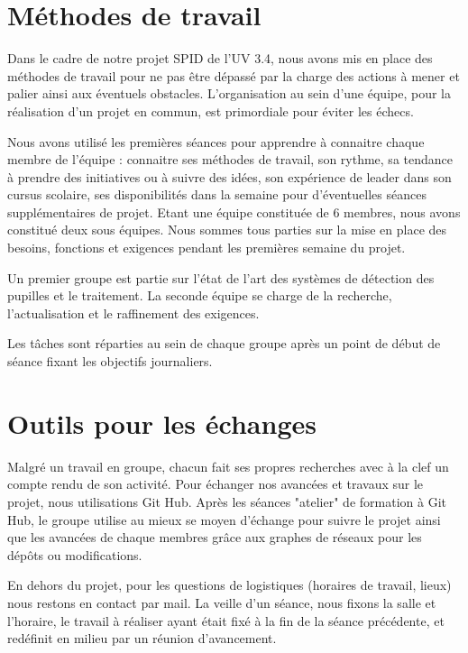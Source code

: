 
\chapter{Méthodes de travail}

Dans le cadre de notre projet SPID de l’UV 3.4, nous avons mis en place des méthodes de travail pour ne pas être dépassé par la charge des actions à mener et palier ainsi aux éventuels obstacles.  
L’organisation au sein d’une équipe, pour la réalisation d’un projet en commun, est primordiale pour éviter les échecs.

Nous avons utilisé les premières séances pour apprendre à connaitre chaque membre de l’équipe : connaitre ses méthodes de travail, son rythme, sa tendance à prendre des initiatives ou à suivre des idées, son expérience de leader dans son cursus scolaire, ses disponibilités dans la semaine pour d’éventuelles séances supplémentaires de projet. 
Etant une équipe constituée de 6 membres, nous avons constitué deux sous équipes. Nous sommes tous parties sur la mise en place des besoins, fonctions et exigences pendant les premières semaine du projet. 

Un premier groupe est partie sur l'état de l'art des systèmes de détection des pupilles et le traitement. La seconde équipe se charge de la recherche, l'actualisation et le raffinement  des exigences. 

Les tâches sont réparties au sein de chaque groupe après un point de début de séance fixant les objectifs journaliers. 

\chapter{Outils pour les échanges}

Malgré un travail en groupe, chacun fait ses propres recherches avec à la clef un compte rendu de son activité. Pour échanger nos avancées et travaux sur le projet, nous utilisations Git Hub. Après les séances "atelier" de formation à Git Hub, le groupe utilise au mieux se moyen d'échange pour suivre le projet ainsi que les avancées de chaque membres grâce aux graphes de réseaux pour les dépôts ou modifications. 

En dehors du projet, pour les questions de logistiques (horaires de travail, lieux) nous restons en contact par mail. La veille d'un séance, nous fixons la salle et l'horaire, le travail à réaliser ayant était fixé à la fin de la séance précédente, et redéfinit en milieu par un réunion d'avancement.  

